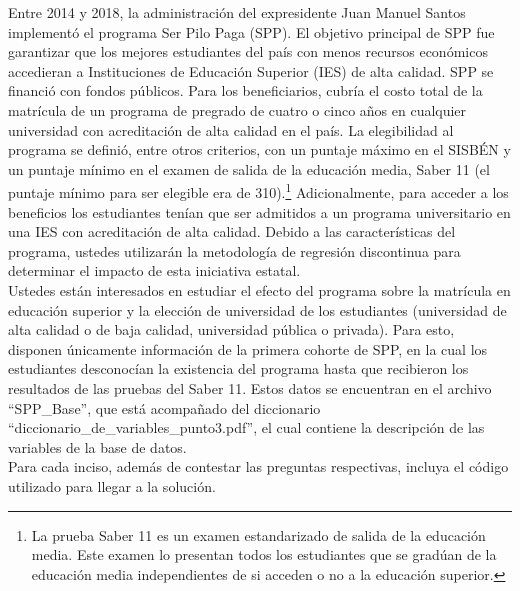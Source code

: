 \documentclass[a4paper]{article}
\begin{document}
Entre 2014 y 2018, la administración del expresidente Juan Manuel Santos implementó el
programa Ser Pilo Paga (SPP). El objetivo principal de SPP fue garantizar que los mejores
estudiantes del país con menos recursos económicos accedieran a Instituciones de Educación
Superior (IES) de alta calidad. SPP se financió con fondos públicos. Para los beneficiarios,
cubría el costo total de la matrícula de un programa de pregrado de cuatro o cinco años en
cualquier universidad con acreditación de alta calidad en el país.
La elegibilidad al programa se definió, entre otros criterios, con un puntaje máximo en el
SISBÉN y un puntaje mínimo en el examen de salida de la educación media, Saber 11 (el puntaje mínimo para ser elegible era de 310).\footnote{La prueba Saber 11 es un examen estandarizado de salida de la educación media. Este examen lo presentan
todos los estudiantes que se gradúan de la educación media independientes de si acceden o no a la educación
superior.} Adicionalmente, para acceder a los beneficios los estudiantes tenían que ser admitidos a un
programa universitario en una IES con acreditación de alta calidad. Debido a las características del programa, ustedes utilizarán la metodología de regresión discontinua para determinar el impacto de esta iniciativa estatal. \\


Ustedes están interesados en estudiar el efecto del programa sobre la matrícula en educación
superior y la elección de universidad de los estudiantes (universidad de alta calidad
o de baja calidad,  universidad pública o privada). Para esto, disponen únicamente información de la
primera cohorte de SPP, en la cual los estudiantes desconocían la existencia del programa hasta
que recibieron los resultados de las pruebas del Saber 11. Estos datos se encuentran en el archivo ``SPP\_Base'', que está acompañado del diccionario ``diccionario\_de\_variables\_punto3.pdf'', el cual contiene la descripción de las variables de la base de datos. \\

Para cada inciso, además de contestar las preguntas respectivas, incluya el código utilizado para llegar a la solución.
\end{document}
